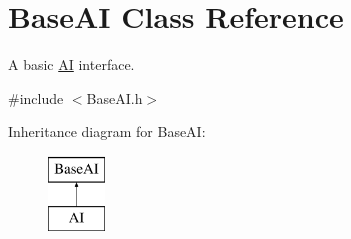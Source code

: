 \hypertarget{classBaseAI}{\section{\-Base\-A\-I \-Class \-Reference}
\label{classBaseAI}
}


\-A basic \hyperlink{classAI}{\-A\-I} interface.  




{\ttfamily \#include $<$\-Base\-A\-I.\-h$>$}

\-Inheritance diagram for \-Base\-A\-I\-:\begin{figure}[H]
\begin{center}
\leavevmode
\includegraphics[height=2.000000cm]{classBaseAI}
\end{center}
\end{figure}
